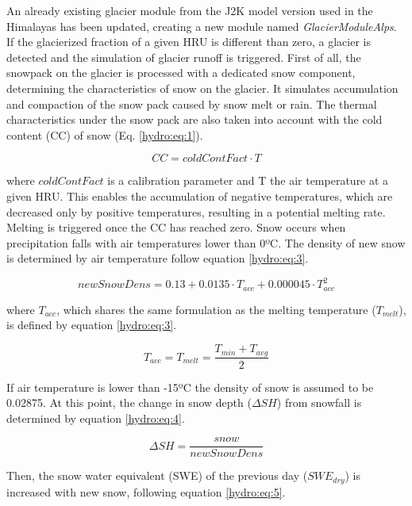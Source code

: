 An already existing glacier module from the J2K model version used in the Himalayas has been updated, creating a new module named \textit{GlacierModuleAlps}. If the glacierized fraction of a given HRU is different than zero, a glacier is detected and the simulation of glacier runoff is triggered. First of all, the snowpack on the glacier is processed with a dedicated snow component, determining the characteristics of snow on the glacier. It simulates accumulation and compaction of the snow pack caused by snow melt or rain. The thermal characteristics under the snow pack are also taken into account with the cold content (CC) of snow (Eq. \ref{hydro:eq:1}).

\begin{equation} \label{hydro:eq:1}
 CC = coldContFact \cdot T
 \end{equation} 
 
where $coldContFact$ is a calibration parameter and T the air temperature at a given HRU. This enables the accumulation of negative temperatures, which are decreased only by positive temperatures, resulting in a potential melting rate. Melting is triggered once the CC has reached zero. Snow occurs when precipitation falls with air temperatures lower than 0ºC. The density of new snow is determined by air temperature follow equation \ref{hydro:eq:3}.

\begin{equation} \label{hydro:eq:2}
 newSnowDens = 0.13 + 0.0135 \cdot T_{acc} + 0.000045 \cdot T_{acc}^{2}
\end{equation} 
 
where $T_{acc}$, which shares the same formulation as the melting temperature ($T_{melt}$), is defined by equation \ref{hydro:eq:3}.

\begin{equation} \label{hydro:eq:3}
 T_{acc} = T_{melt} = \frac{T_{min} + T_{avg}}{2}
\end{equation} 

If air temperature is lower than -15ºC the density of snow is assumed to be 0.02875. At this point, the change in snow depth ($\Delta SH$) from snowfall is determined by equation \ref{hydro:eq:4}.

\begin{equation} \label{hydro:eq:4}
 \Delta SH = \frac{snow}{newSnowDens}
\end{equation} 

Then, the snow water equivalent (SWE) of the previous day ($SWE_{dry}$) is increased with new snow, following equation \ref{hydro:eq:5}.

